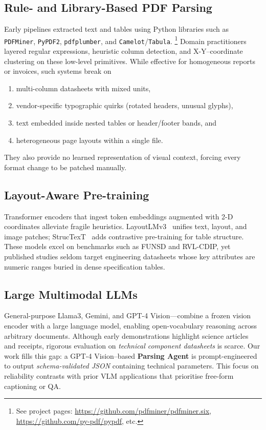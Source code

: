 \subsection{Rule- and Library-Based PDF Parsing}
Early pipelines extracted text and tables using Python libraries such as
\texttt{PDFMiner}, \texttt{PyPDF2}, \texttt{pdfplumber}, and
\texttt{Camelot}/\texttt{Tabula}.%
\footnote{See project pages: \url{https://github.com/pdfminer/pdfminer.six},
\url{https://github.com/py-pdf/pypdf}, etc.}  
Domain practitioners layered regular expressions, heuristic column detection,
and X-Y–coordinate clustering on these low-level primitives.
While effective for homogeneous reports or invoices, such systems break on

\begin{enumerate}
  \item multi-column datasheets with mixed units,
  \item vendor-specific typographic quirks (rotated headers, unusual glyphs),
  \item text embedded inside nested tables or header/footer bands, and
  \item heterogeneous page layouts within a single file.
\end{enumerate}

They also provide no learned representation of visual context, forcing every
format change to be patched manually.

\subsection{Layout-Aware Pre-training}
Transformer encoders that ingest token embeddings augmented with 2-D
coordinates alleviate fragile heuristics.
LayoutLMv3~\cite{xuhuang2022layoutlmv3} unifies text, layout, and image
patches; StrucTexT~\cite{li2021structext} adds contrastive pre-training for
table structure.
These models excel on benchmarks such as FUNSD and RVL-CDIP, yet published
studies seldom target engineering datasheets whose key attributes are numeric
ranges buried in dense specification tables.

\subsection{Large Multimodal LLMs}
General-purpose Llama3, Gemini, and GPT-4 Vision—combine a frozen vision
encoder with a large language model, enabling open-vocabulary reasoning across
arbitrary documents.
Although early demonstrations highlight science articles and receipts,
rigorous evaluation on \emph{technical component datasheets} is scarce.
Our work fills this gap: a GPT-4 Vision–based \textbf{Parsing Agent} is
prompt-engineered to output \emph{schema-validated JSON} containing technical parameters.
This focus on reliability contrasts with prior VLM
applications that prioritise free-form captioning or QA.


